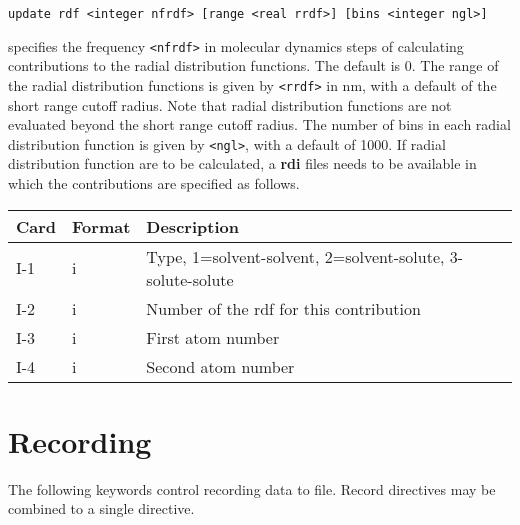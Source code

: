 \begin{description}
\item
\begin{verbatim}
update rdf <integer nfrdf> [range <real rrdf>] [bins <integer ngl>]
\end{verbatim}
specifies the frequency \verb+<nfrdf>+ in molecular dynamics steps of
calculating contributions to the radial distribution functions.
The default is 0. The range of the radial distribution
functions is given by \verb+<rrdf>+ in nm, with a default of the short
range cutoff radius. Note that radial distribution functions are not
evaluated beyond the short range cutoff radius. The number of
bins in each radial distribution function is given by \verb+<ngl>+, with
a default of 1000.
If radial distribution function are to be
calculated, a {\bf rdi} files needs to be available in which the
contributions are specified as follows.
\begin{center}
\begin{tabular}{lll}
\hline\hline
Card & Format & Description \\ \hline
I-1  & i & Type, 1=solvent-solvent, 2=solvent-solute,
3-solute-solute\\
I-2  & i & Number of the rdf for this contribution\\
I-3  & i & First atom number \\
I-4  & i & Second atom number \\ 
\hline
\end{tabular}
\end{center}
\end{description}

\section{Recording}
The following keywords control recording data to file.
Record directives may be combined to a single directive.

